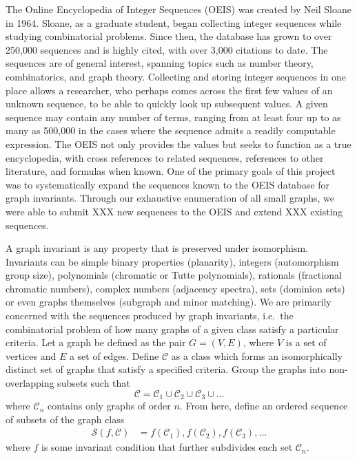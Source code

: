 \documentclass[12pt]{article}
\newcommand{\OEISedits}{XXX\xspace}
\newcommand{\OEISprimary}{XXX\xspace}
\newcommand{\SEQ}{\mathcal{S}}
\newcommand{\CLASS}{\mathcal{C}}
\newcommand{\ie}[0]{i.e.\ }
\begin{document}
The Online Encyclopedia of Integer Sequences (OEIS) was created by Neil Sloane in 1964.
Sloane, as a graduate student, began collecting integer sequences while studying combinatorial problems.
Since then, the database has grown to over 250,000 sequences and is highly cited, with over 3,000 citations to date\cite{sloane2003line}.
The sequences are of general interest, spanning topics such as number theory, combinatorics, and graph theory.
Collecting and storing integer sequences in one place allows a researcher, who perhaps comes across the first few values of an unknown sequence, to be able to quickly look up subsequent values. 
A given sequence may contain any number of terms, ranging from at least four up to as many as 500,000 in the cases where the sequence admits a readily computable expression.
The OEIS not only provides the values but seeks to function as a true encyclopedia, with cross references to related sequences, references to other literature, and formulas when known.
One of the primary goals of this project was to systematically expand the sequences known to the OEIS database for graph invariants.
Through our exhaustive enumeration of all small graphs, we were able to submit \OEISprimary new sequences to the OEIS and extend \OEISedits existing sequences.

A graph invariant is any property that is preserved under isomorphism. 
Invariants can be simple binary properties (planarity), integers (automorphism group size), polynomials (chromatic or Tutte polynomials), rationals (fractional chromatic numbers), complex numbers (adjacency spectra), sets (dominion sets) or even graphs themselves (subgraph and minor matching). 
We are primarily concerned with the sequences produced by graph invariants, \ie the combinatorial problem of how many graphs of a given class satisfy a particular criteria.
Let a graph be defined as the pair $G = (V,E)$, where $V$ is a set of vertices and $E$ a set of edges. 
Define $\CLASS$ as a class which forms an isomorphically distinct set of graphs that satisfy a specified criteria.
Group the graphs into non-overlapping subsets such that
\begin{equation}
\CLASS = \CLASS_1 \cup \CLASS_2 \cup \CLASS_3 \cup \ldots
\end{equation}
where $\CLASS_n$ contains only graphs of order $n$.
From here, define an ordered sequence of subsets of the graph class
%
\begin{align}
\SEQ(f, \CLASS) 
&= f(\CLASS_1), f(\CLASS_2), f(\CLASS_3), \ldots
\end{align}
%
where $f$ is some invariant condition that further subdivides each set $\CLASS_n$.
\end{document}
